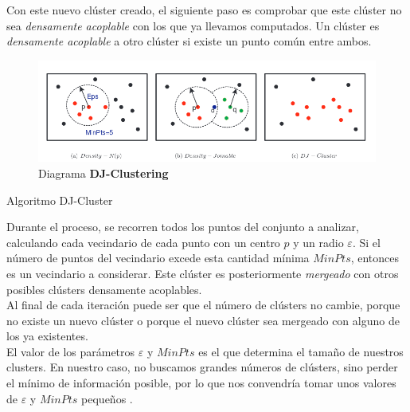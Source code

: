 \documentclass[a4paper, 12pt, spanish]{article}
\begin{document}
Con este nuevo cl\'uster creado, el siguiente paso es comprobar que este cl\'uster no sea \textit{densamente acoplable} con los que ya llevamos computados. Un cl\'uster es \textit{densamente acoplable} a otro cl\'uster si existe un punto com\'un entre ambos. \\

\begin{figure}[H]
\centering
	\includegraphics[scale=.7]{djcluster.png}
\caption{Diagrama \textbf{DJ-Clustering}}
\end{figure}

\begin{algorithm}[!htbp]\label{djCluster}
\begin{algorithmic}[1]
		\Else
		\EndIf
	\EndFor
\end{algorithmic}
\caption{\label{alg:djcluster} Algoritmo DJ-Cluster}
\end{algorithm}

Durante el proceso, se recorren todos los puntos del conjunto a analizar, calculando cada vecindario de cada punto con un centro $p$ y un radio $\varepsilon$. Si el n\'umero de puntos del vecindario excede esta cantidad m\'inima $MinPts$, entonces es un vecindario a considerar. Este cl\'uster es posteriormente \textit{mergeado} con otros posibles cl\'usters densamente acoplables. \\

Al final de cada iteraci\'on puede ser que el n\'umero de cl\'usters no cambie, porque no existe un nuevo cl\'uster o porque el nuevo cl\'uster sea mergeado con alguno de los ya existentes.\\

El valor de los par\'ametros $\varepsilon$ y $MinPts$ es el que determina el tama\~no de nuestros clusters. En nuestro caso, no buscamos grandes n\'umeros de cl\'usters, sino perder el m\'inimo de informaci\'on posible, por lo que nos convendr\'ia tomar unos valores de $\varepsilon$ y $MinPts$ peque\~nos \cite{clusteringApproach}.\\
\end{document}
